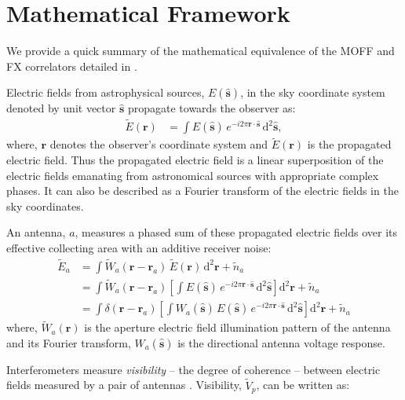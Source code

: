 \documentclass[a4paper,fleqn,usenatbib]{../mnras}
\newcommand{\dif}{\mathrm{d}}
\begin{document}

\section{Mathematical Framework}\label{sec:math}

We provide a quick summary of the mathematical equivalence of the MOFF and FX correlators detailed in \citet{mor11}.

Electric fields from astrophysical sources, $E(\hat{\mathbf{s}})$, in the sky coordinate system denoted by unit vector $\hat{\mathbf{s}}$ propagate towards the observer as:
\begin{align}
  \widetilde{E}(\mathbf{r}) &= \int E(\hat{\mathbf{s}})\,e^{-i2\pi\mathbf{r}\cdot\hat{\mathbf{s}}}\,\dif^2\hat{\mathbf{s}},
\end{align}
where, $\mathbf{r}$ denotes the observer's coordinate system and $\widetilde{E}(\mathbf{r})$ is the propagated electric field. Thus the propagated electric field is a linear superposition of the electric fields emanating from astronomical sources with appropriate complex phases. It can also be described as a Fourier transform of the electric fields in the sky coordinates. 

An antenna, $a$, measures a phased sum of these propagated electric fields over its effective collecting area with an additive receiver noise:
\begin{align}\label{eqn:measured-E-field}
  \widetilde{E}_a &= \int \widetilde{W}_a(\mathbf{r}-\mathbf{r}_a)\,\widetilde{E}(\mathbf{r})\,\dif^2\mathbf{r} + \widetilde{n}_a \\
                  &= \int \widetilde{W}_a(\mathbf{r}-\mathbf{r}_a) \left[ \int E(\hat{\mathbf{s}})\,e^{-i2\pi\mathbf{r}\cdot\hat{\mathbf{s}}}\,\dif^2\hat{\mathbf{s}} \right] \dif^2\mathbf{r} + \widetilde{n}_a \\
                  &= \int \delta(\mathbf{r}-\mathbf{r}_a) \left[ \int {W}_a(\hat{\mathbf{s}})\,E(\hat{\mathbf{s}})\,e^{-i2\pi\mathbf{r}\cdot\hat{\mathbf{s}}}\,\dif^2\hat{\mathbf{s}} \right] \dif^2\mathbf{r} + \widetilde{n}_a
\end{align}
where, $\widetilde{W}_a(\mathbf{r})$ is the aperture electric field illumination pattern of the antenna and its Fourier transform, $W_a(\hat{\mathbf{s}})$ is the directional antenna voltage response.

Interferometers measure {\it visibility} -- the degree of coherence -- between electric fields measured by a pair of antennas \citep{van34,zer38,tho01}. Visibility, $\widetilde{V}_p$, can be written as:
\end{document}
